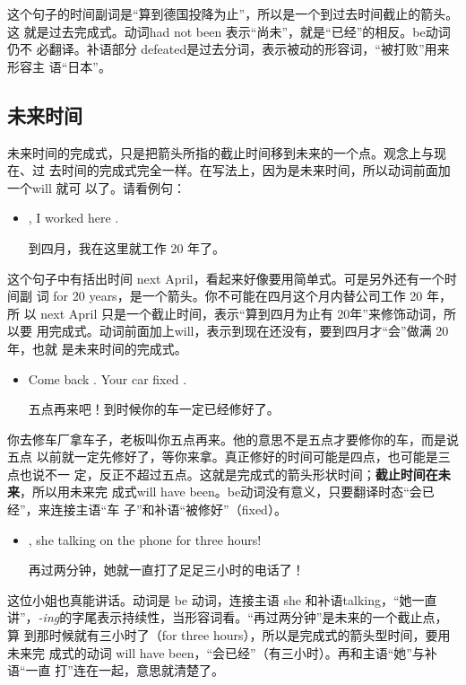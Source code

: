 这个句子的时间副词是“算到德国投降为止”，所以是一个到过去时间截止的箭头。这
就是过去完成式。动词had not been 表示“尚未”，就是“已经”的相反。be动词仍不
必翻译。补语部分 defeated是过去分词，表示被动的形容词，“被打败”用来形容主
语“日本”。

\subsection{未来时间}

未来时间的完成式，只是把箭头所指的截止时间移到未来的一个点。观念上与现在、过
去时间的完成式完全一样。在写法上，因为是未来时间，所以动词前面加一个will 就可
以了。请看例句：

\begin{itemize}
\item  {}, I  worked here .

  到四月，我在这里就工作 20 年了。
\end{itemize}

这个句子中有括出时间 next April，看起来好像要用简单式。可是另外还有一个时间副
词 for 20 years，是一个箭头。你不可能在四月这个月内替公司工作 20 年，所
以 next April 只是一个截止时间，表示“算到四月为止有 20年”来修饰动词，所以要
用完成式。动词前面加上will，表示到现在还没有，要到四月才“会”做满 20年，也就
是未来时间的完成式。

\begin{itemize}
\item  Come back . Your car  fixed .

  五点再来吧！到时候你的车一定已经修好了。
\end{itemize}

你去修车厂拿车子，老板叫你五点再来。他的意思不是五点才要修你的车，而是说五点
以前就一定先修好了，等你来拿。真正修好的时间可能是四点，也可能是三点也说不一
定，反正不超过五点。这就是完成式的箭头形状时间；\textbf{截止时间在未来}，所以用未来完
成式will have been。be动词没有意义，只要翻译时态“会已经”，来连接主语“车
子”和补语“被修好”（fixed）。

\begin{itemize}
\item {}, she  talking on the phone for
  three hours!

  再过两分钟，她就一直打了足足三小时的电话了！
\end{itemize}

这位小姐也真能讲话。动词是 be 动词，连接主语 she 和补语talking，“她一直
讲”，\emph{-ing}的字尾表示持续性，当形容词看。“再过两分钟”是未来的一个截止点，算
到那时候就有三小时了（for three hours），所以是完成式的箭头型时间，要用未来完
成式的动词 will have been，“会已经”（有三小时）。再和主语“她”与补语“一直
打”连在一起，意思就清楚了。

